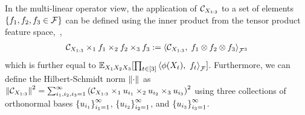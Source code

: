 \documentclass{article}
\begin{document}
In the multi-linear operator view,
the application of $\mathcal{C}_{X_{1:3}}$ to a set of elements $\left\{f_1,f_2,f_3 \in \mathcal{F}\right\}$ can be defined using the inner product from the tensor product feature space,~\ie,
\begin{align*}
	\mathcal{C}_{X_{1:3}} \times_1 f_1 \times_2 f_2 \times_3 f_3
	:= \left\langle \mathcal{C}_{X_{1:3}},\;f_1\otimes f_2\otimes f_3 \right\rangle_{\mathcal{F}^3}
\end{align*}
which is further equal to $\mathbb{E}_{X_1X_2X_3}[\prod_{t \in [3]} \left\langle \phi(X_t),~f_t \right\rangle_{\mathcal{F}}]$.
Furthermore, we can define the Hilbert-Schmidt norm $\left\|\cdot\right\|_{}$ as
$
 \left\|\mathcal{C}_{X_{1:3}}\right\|_{}^2 = \sum_{i_1,i_2,i_3 = 1}^\infty \left(\mathcal{C}_{X_{1:3}} \times_1 u_{i_1} \times_2 u_{i_2} \times_3 u_{i_3}\right)^2
$
using three collections of orthonormal bases $\left\{u_{i_1}\right\}_{i_1=1}^\infty$, $\left\{u_{i_2}\right\}_{i_2=1}^\infty$, and $\left\{u_{i_3}\right\}_{i_3=1}^\infty$.
\end{document}
